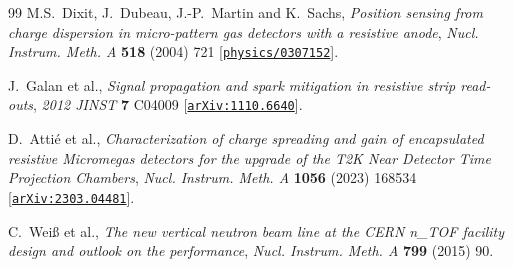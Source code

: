 \documentclass[a4paper,11pt]{article}
\begin{document}
\begin{thebibliography}{99}
M.S.~Dixit, J.~Dubeau, J.-P.~Martin and K.~Sachs, \emph{Position sensing from charge dispersion in
micro-pattern gas detectors with a resistive anode}, \emph{Nucl. Instrum. Meth. A} \textbf{518}
(2004) 721 [\href{https://arxiv.org/abs/physics/0307152}{\texttt{physics/0307152}}].

J.~Galan et al., \emph{Signal propagation and spark mitigation in resistive strip read-outs},
\emph{2012 JINST} \textbf{7} C04009 [\href{https://arxiv.org/abs/1110.6640}{\texttt{arXiv:1110.6640}}].

D.~Atti\'e et al., \emph{Characterization of charge spreading and gain of encapsulated resistive
Micromegas detectors for the upgrade of the T2K Near Detector Time Projection Chambers},
\emph{Nucl. Instrum. Meth. A} \textbf{1056} (2023) 168534
[\href{https://arxiv.org/abs/2303.04481}{\texttt{arXiv:2303.04481}}].

C.~Wei\ss{} et al., \emph{The new vertical neutron beam line at the CERN n\_TOF facility design and
outlook on the performance}, \emph{Nucl. Instrum. Meth. A} \textbf{799} (2015) 90.

\end{thebibliography}
\end{document}
